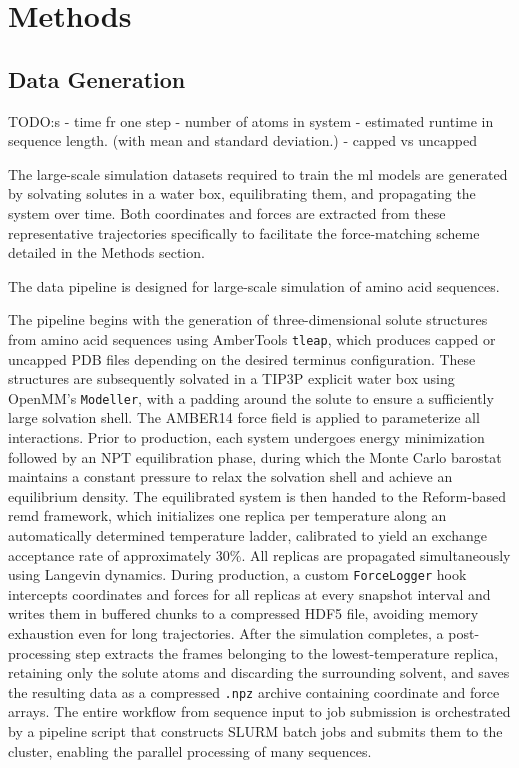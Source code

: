 
\section{Methods}

\subsection{Data Generation}
\label{subsec:data_generation}

TODO:s
- time fr one step
- number of atoms in system
- estimated  runtime in sequence length. (with mean and standard deviation.)
- capped vs uncapped

The large-scale simulation datasets required to train the \gls{ml} models are generated by solvating solutes in a water box, equilibrating them, and propagating the system over time. Both coordinates and forces are extracted from these representative trajectories specifically to facilitate the force-matching scheme detailed in the Methods section.


The data pipeline is designed for large-scale simulation of amino acid sequences. 

The pipeline begins with the generation of three-dimensional solute structures from amino acid sequences using AmberTools \texttt{tleap}, which produces capped or uncapped PDB files depending on the desired terminus configuration. 
These structures are subsequently solvated in a TIP3P explicit water box using OpenMM's \texttt{Modeller}, with a padding around the solute to ensure a sufficiently large solvation shell. The AMBER14 force field is applied to parameterize all interactions. Prior to production, each system undergoes energy minimization followed by an NPT equilibration phase, during which the Monte Carlo barostat maintains a constant pressure to relax the solvation shell and achieve an equilibrium density. The equilibrated system is then handed to the Reform-based \gls{remd} framework, which initializes one replica per temperature along an automatically determined temperature ladder, calibrated to yield an exchange acceptance rate of approximately 30\%. All replicas are propagated simultaneously using Langevin dynamics. During production, a custom \texttt{ForceLogger} hook intercepts coordinates and forces for all replicas at every snapshot interval and writes them in buffered chunks to a compressed HDF5 file, avoiding memory exhaustion even for long trajectories. After the simulation completes, a post-processing step extracts the frames belonging to the lowest-temperature replica, retaining only the solute atoms and discarding the surrounding solvent, and saves the resulting data as a compressed \texttt{.npz} archive containing coordinate and force arrays. The entire workflow from sequence input to job submission is orchestrated by a pipeline script that constructs SLURM batch jobs and submits them to the cluster, enabling the parallel processing of many sequences.

